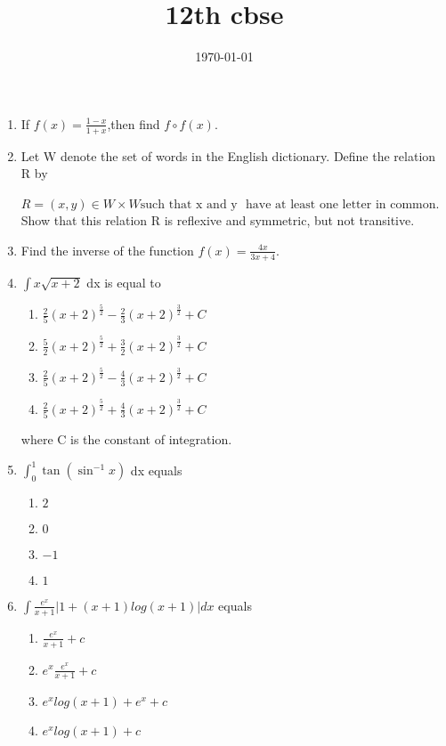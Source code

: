 \documentclass[12pt]{article}
\title{12th cbse}
\date{\today}
\begin{document}
\begin{enumerate}
\item If $f(x)=\frac{1-x}{1+x}$,then find $f\circ f(x)$.
\item Let W denote the set of words in the English dictionary. Define the relation R by

$R = (x, y) \in W \times W \text{such that} \text{ x  and y }  \text{ have at least one letter in common}$.
Show that this relation R is reflexive and symmetric, but not transitive.

\item Find the inverse of the function $f(x) = \frac{4x}{3x+4}$.

\item $\int x \sqrt{x + 2}$ dx is equal to
\begin{enumerate}
\item $\frac{2}{5}(x + 2)^{\frac{5}{2}} - \frac{2}{3}(x + 2)^{\frac{3}{2}} + C$
\item $\frac{5}{2}(x + 2)^{\frac{5}{2}} + \frac{3}{2}(x + 2)^{\frac{3}{2}} + C$
\item $\frac{2}{5}(x + 2)^{\frac{5}{2}} - \frac{4}{3}(x + 2)^{\frac{3}{2}} + C$
\item $\frac{2}{5}(x + 2)^{\frac{5}{2}} + \frac{4}{3}(x + 2)^{\frac{3}{2}} + C$
\end{enumerate}

where C is the constant of integration.

\item  $\int_{0}^{1} \tan(\sin^{-1}x)$ dx equals
\begin{enumerate}

\item $2$ 
\item  $0$
\item  $-1$
\item  $1$
\end{enumerate}

\item $\int {\frac{e^x}{x+1}}|1+(x+1)log(x+1)| dx $ equals
\begin{enumerate}
\item  $\frac{e^x}{x+1}+c$
\item  $e^x\frac{e^x}{x+1}+c$
\item  $e^xlog(x+1)+e^x+c$
\item  $e^xlog(x+1)+c$
\end{enumerate}


\end{enumerate}
\end{document}
